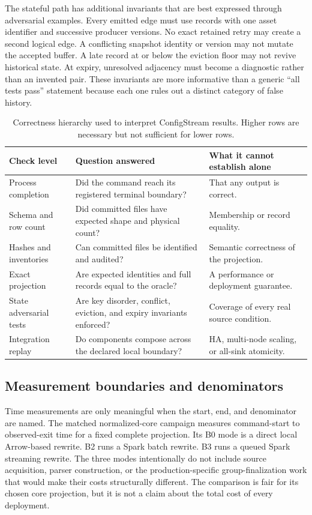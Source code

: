 The stateful path has additional invariants that are best expressed through adversarial examples. Every emitted edge must use records with one asset identifier and successive producer versions. No exact retained retry may create a second logical edge. A conflicting snapshot identity or version may not mutate the accepted buffer. A late record at or below the eviction floor may not revive historical state. At expiry, unresolved adjacency must become a diagnostic rather than an invented pair. These invariants are more informative than a generic ``all tests pass'' statement because each one rules out a distinct category of false history.

\begin{table}[ht]
\centering
\caption{Correctness hierarchy used to interpret ConfigStream results. Higher rows are necessary but not sufficient for lower rows.}
\label{tab:correctness-hierarchy}
\small
\begin{tabularx}{\textwidth}{p{}X X}
\toprule
Check level & Question answered & What it cannot establish alone \\
\midrule
Process completion & Did the command reach its registered terminal boundary? & That any output is correct. \\
Schema and row count & Did committed files have expected shape and physical count? & Membership or record equality. \\
Hashes and inventories & Can committed files be identified and audited? & Semantic correctness of the projection. \\
Exact projection & Are expected identities and full records equal to the oracle? & A performance or deployment guarantee. \\
State adversarial tests & Are key disorder, conflict, eviction, and expiry invariants enforced? & Coverage of every real source condition. \\
Integration replay & Do components compose across the declared local boundary? & HA, multi-node scaling, or all-sink atomicity. \\
\bottomrule
\end{tabularx}
\end{table}

\subsection{Measurement boundaries and denominators}

Time measurements are only meaningful when the start, end, and denominator are named. The matched normalized-core campaign measures command-start to observed-exit time for a fixed complete projection. Its B0 mode is a direct local Arrow-based rewrite. B2 runs a Spark batch rewrite. B3 runs a queued Spark streaming rewrite. The three modes intentionally do not include source acquisition, parser construction, or the production-specific group-finalization work that would make their costs structurally different. The comparison is fair for its chosen core projection, but it is not a claim about the total cost of every deployment.

